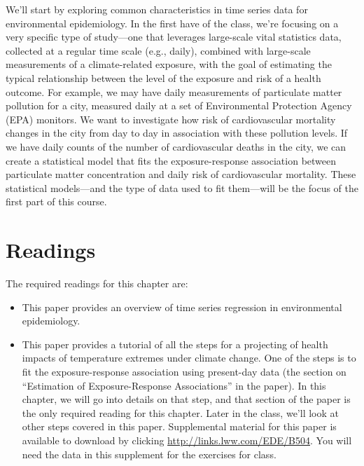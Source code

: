\documentclass[
]{book}
\providecommand{\tightlist}{%
  \setlength{\itemsep}{0pt}\setlength{\parskip}{0pt}}
\begin{document}
We'll start by exploring common characteristics in time series data for
environmental epidemiology. In the first have of the class, we're
focusing on a very specific type of study---one that leverages large-scale
vital statistics data, collected at a regular time scale (e.g., daily),
combined with large-scale measurements of a climate-related exposure, with
the goal of estimating the typical relationship between the level of the
exposure and risk of a health outcome. For example, we may have daily
measurements of particulate matter pollution for a city, measured daily at a set
of Environmental Protection Agency (EPA) monitors. We want to investigate
how risk of cardiovascular mortality changes in the city from day to day
in association with these pollution levels. If we have daily counts of the
number of cardiovascular deaths in the city, we can create a statistical
model that fits the exposure-response association between particulate matter
concentration and daily risk of cardiovascular mortality. These statistical
models---and the type of data used to fit them---will be the focus of the
first part of this course.

\hypertarget{readings}{%
\section{Readings}\label{readings}}

The required readings for this chapter are:

\begin{itemize}
\tightlist
\item
  \citet{bhaskaran2013time} This paper provides an overview of time series regression
  in environmental epidemiology.
\item
  \citet{vicedo2019hands} This paper provides a tutorial of all the steps for a
  projecting of health impacts of temperature extremes under climate change.
  One of the steps is to fit the exposure-response association using present-day data
  (the section on ``Estimation of Exposure-Response Associations'' in the paper).
  In this chapter, we will go into details on that step, and that section of the paper
  is the only required reading for this chapter. Later in the class, we'll
  look at other steps covered in this paper. Supplemental material for this paper is
  available to download by
  clicking \url{http://links.lww.com/EDE/B504}. You will need the data in this supplement
  for the exercises for class.
\end{itemize}
\end{document}
